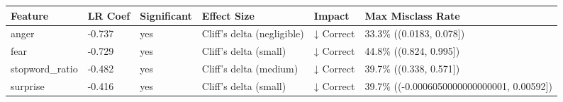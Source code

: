 \begin{tabular}{llllll}
\toprule
Feature & LR Coef & Significant & Effect Size & Impact & Max Misclass Rate \\
\midrule
anger & -0.737 & yes & Cliff's delta (negligible) & ↓ Correct & 33.3\% ((0.0183, 0.078]) \\
fear & -0.729 & yes & Cliff's delta (small) & ↓ Correct & 44.8\% ((0.824, 0.995]) \\
stopword\_ratio & -0.482 & yes & Cliff's delta (medium) & ↓ Correct & 39.7\% ((0.338, 0.571]) \\
surprise & -0.416 & yes & Cliff's delta (small) & ↓ Correct & 39.7\% ((-0.0006050000000000001, 0.00592]) \\
\bottomrule
\end{tabular}
